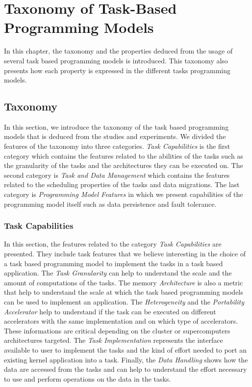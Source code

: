 \chapter{Taxonomy of Task-Based Programming Models}
\label{chap:taxonomy}

In this chapter, the taxonomy and the properties deduced from the usage of several task based programming models is introduced.
This taxonomy also presents how each property is expressed in the different tasks programming models.

\section{Taxonomy}
In this section, we introduce the taxonomy of the task based programming models that is deduced from the studies and experiments.
We divided the features of the taxonomy into three categories.
\textit{Task Capabilities} is the first category which contains the features related to the abilities of the tasks such as the granularity of the tasks and the architectures they can be executed on.
The second category is \textit{Task and Data Management} which contains the features related to the scheduling properties of the tasks and data migrations.
The last category is \textit{Programming Model Features} in which we present capabilities of the programming model itself such as data persistence and fault tolerance.


\subsection{Task Capabilities}
In this section, the features related to the category \textit{Task Capabilities} are presented.
They include task features that we believe interesting in the choice of a task based programming model to implement the tasks in a task based application.
The \textit{Task Granularity} can help to understand the scale and the amount of computations of the tasks.
The memory \textit{Architecture} is also a metric that help to understand the scale at which the task based programming models can be used to implement an application.
The \textit{Heterogeneity} and the \textit{Portability Accelerator} help to understand if the task can be executed on different accelerators with the same implementation and on which type of accelerators.
These informations are critical depending on the cluster or supercomputers architectures targeted.
The \textit{Task Implementation} represents the interface available to user to implement the tasks and the kind of effort needed to port an existing kernel application into a task.
Finally, the \textit{Data Handling} shows how the data are accessed from the tasks and can help to understand the effort necessary to use and perform operations on the data in the tasks.

